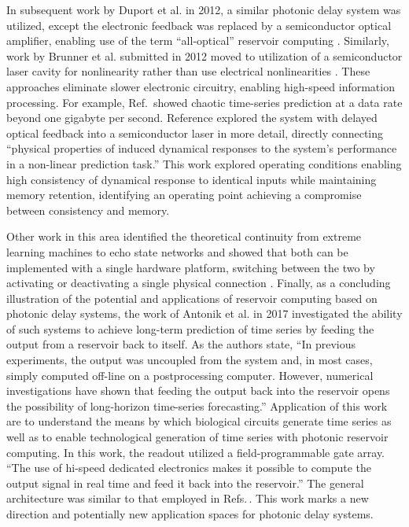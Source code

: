 In subsequent work by Duport et al. in 2012, a similar photonic delay system was utilized, except the electronic feedback was replaced by a semiconductor optical amplifier, enabling use of the term ``all-optical'' reservoir computing \cite{dusc2012}. Similarly, work by Brunner et al. submitted in 2012 moved to utilization of a semiconductor laser cavity for nonlinearity rather than use electrical nonlinearities \cite{brso2013}. These approaches eliminate slower electronic circuitry, enabling high-speed information processing. For example, Ref.\, showed chaotic time-series prediction at a data rate beyond one gigabyte per second. Reference  explored the system with delayed optical feedback into a semiconductor laser in more detail, directly connecting ``physical properties of induced dynamical responses to the system's performance in a non-linear prediction task.'' This work explored operating conditions enabling high consistency of dynamical response to identical inputs while maintaining memory retention, identifying an operating point achieving a compromise between consistency and memory. 

Other work in this area identified the theoretical continuity from extreme learning machines to echo state networks and showed that both can be implemented with a single hardware platform, switching between the two by activating or deactivating a single physical connection \cite{orso2015}. Finally, as a concluding illustration of the potential and applications of reservoir computing based on photonic delay systems, the work of Antonik et al. in 2017 investigated the ability of such systems to achieve long-term prediction of time series by feeding the output from a reservoir back to itself. As the authors state, ``In previous experiments, the output was uncoupled from the system and, in most cases, simply computed off-line on a postprocessing computer. However, numerical investigations have shown that feeding the output back into the reservoir opens the possibility of long-horizon time-series forecasting.'' Application of this work are to understand the means by which biological circuits generate time series as well as to enable technological generation of time series with photonic reservoir computing. In this work, the readout utilized a field-programmable gate array. ``The use of hi-speed dedicated electronics makes it possible to compute the output signal in real time and feed it back into the reservoir.'' The general architecture was similar to that employed in Refs.\,. This work marks a new direction and potentially new application spaces for photonic delay systems.

